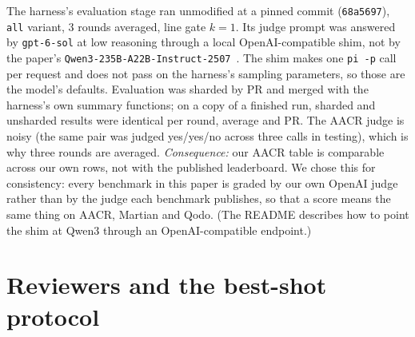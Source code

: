 \documentclass[11pt,a4paper]{article}
\newcommand{\code}[1]{\texttt{#1}}
\begin{document}
The harness's evaluation stage ran unmodified at a pinned commit
(\code{68a5697}), \code{all} variant, 3 rounds averaged, line gate $k=1$.
Its judge prompt was answered by \code{gpt-6-sol} at low reasoning through a
local OpenAI-compatible shim, not by the paper's
\code{Qwen3-235B-A22B-Instruct-2507}~\cite{aacrbench}. The shim makes one
\code{pi -p} call per request and does not pass on the harness's sampling
parameters, so those are the model's defaults. Evaluation was sharded by PR
and merged with the harness's own summary functions; on a copy of a
finished run, sharded and unsharded results were identical per round,
average and PR. The AACR judge is noisy (the same pair was judged yes/yes/no
across three calls in testing), which is why three rounds are averaged.
\emph{Consequence:} our AACR table is comparable across our own rows, not
with the published leaderboard. We chose this for consistency: every
benchmark in this paper is graded by our own OpenAI judge rather than by the
judge each benchmark publishes, so that a score means the same thing on
AACR, Martian and Qodo. (The README describes how to point the shim at
Qwen3 through an OpenAI-compatible endpoint.)

\section{Reviewers and the best-shot protocol}
\label{sec:setup}
\end{document}
